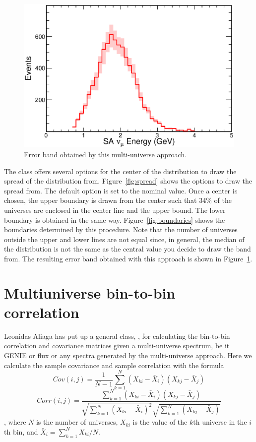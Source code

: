 \documentclass[12pt,a4paper,final]{iopart}
\begin{document}
\begin{figure}[h]
  \centering
  \includegraphics[width=.75\textwidth]{figures/reco_nue_w_error.eps}
  \caption{Error band obtained by this multi-universe approach.}
  \label{fig:reco_nue_w_error}
\end{figure}

The class offers several options for the center of the distribution to draw the spread of the distribution from. Figure~\ref{fig:spread} shows the options to draw the spread from. The default option is set to the nominal value. Once a center is chosen, the upper boundary is drawn from the center such that 34\% of the universes are enclosed in the center line and the upper bound. The lower boundary is obtained in the same way. Figure~\ref{fig:boundaries} shows the boundaries determined by this procedure. Note that the number of universes outside the upper and lower lines are not equal since, in general, the median of the distribution is not the same as the central value you decide to draw the band from. The resulting error band obtained with this approach is shown in Figure~\ref{fig:reco_nue_w_error}.

\section{Multiuniverse bin-to-bin correlation}
Leonidas Aliaga has put up a general class, , for calculating the bin-to-bin correlation and covariance matrices given a multi-universe spectrum, be it GENIE or flux or any spectra generated by the multi-universe approach.
Here we calculate the sample covariance and sample correlation with the formula
\begin{equation*}
Cov(i,j)=\frac{1}{N-1}\sum\limits_{k=1}^{N}\left(X_{ki}-\bar{X}_i\right)\left(X_{kj}-\bar{X}_j\right)
\end{equation*}
\begin{equation*}
Corr(i,j)=\frac{\sum\limits_{k=1}^{N}\left(X_{ki}-\bar{X}_i\right)\left(X_{kj}-\bar{X}_j\right)}{\sqrt{\sum\limits_{k=1}^{N}\left(X_{ki}-\bar{X}_i\right)^2}\sqrt{\sum\limits_{k=1}^{N}\left(X_{kj}-\bar{X}_j\right)}}
\end{equation*}
, where $N$ is the number of universes, $X_{ki}$ is the value of the $k$th universe in the $i$th bin, and $\bar{X}_i=\sum_{k=1}^NX_{ki}/N$.
\end{document}
